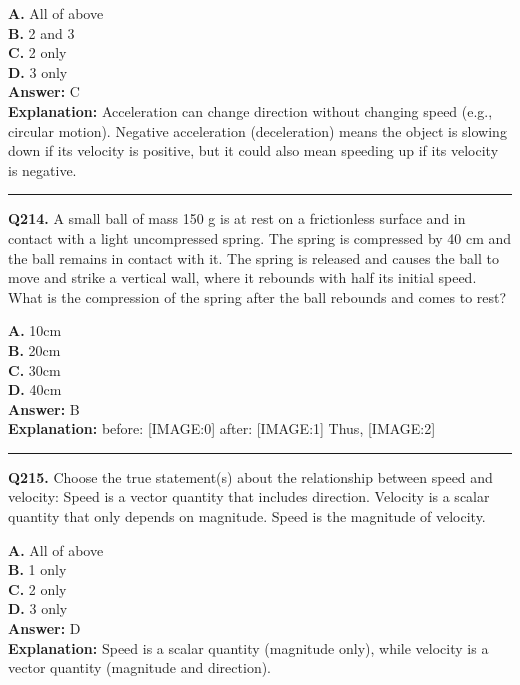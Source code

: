 \documentclass[12pt]{article}
\begin{document}
\textbf{A.} All of above \\
\textbf{B.} 2 and 3 \\
\textbf{C.} 2 only \\
\textbf{D.} 3 only \\

\textbf{Answer:} C \\
\textbf{Explanation:} Acceleration can change direction without changing speed (e.g., circular motion). Negative acceleration (deceleration) means the object is slowing down if its velocity is positive, but it could also mean speeding up if its velocity is negative.

\hrule
\vspace{1em}


\noindent
\textbf{Q214.} A small ball of mass 150 g is at rest on a frictionless surface and in contact with a light uncompressed spring. The spring is compressed by 40 cm and the ball remains in contact with it. The spring is released and causes the ball to move and strike a vertical wall, where it rebounds with half its initial speed. What is the compression of the spring after the ball rebounds and comes to rest?



\textbf{A.} 10cm \\
\textbf{B.} 20cm \\
\textbf{C.} 30cm \\
\textbf{D.} 40cm \\

\textbf{Answer:} B \\
\textbf{Explanation:} before:
[IMAGE:0]
after:
[IMAGE:1]
Thus,
[IMAGE:2]

\hrule
\vspace{1em}


\noindent
\textbf{Q215.} Choose the true statement(s) about the relationship between speed and velocity:
Speed is a vector quantity that includes direction.
Velocity is a scalar quantity that only depends on magnitude.
Speed is the magnitude of velocity.



\textbf{A.} All of above \\
\textbf{B.} 1 only \\
\textbf{C.} 2 only \\
\textbf{D.} 3 only \\

\textbf{Answer:} D \\
\textbf{Explanation:} Speed is a scalar quantity (magnitude only), while velocity is a vector quantity (magnitude and direction).
\end{document}
